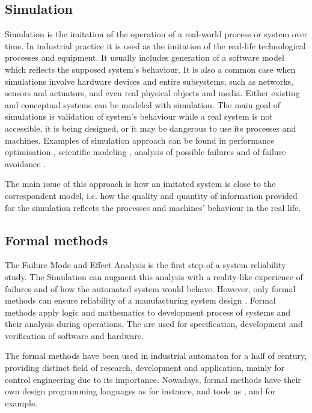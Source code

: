 \subsection{Simulation}

Simulation is the imitation of the operation of a real-world process or system
over time\cite{banks_introduction_1999}. In industrial practice it is used as
the imitation of the real-life technological processes and equipment. It usually
includes generation of a software model which reflects the supposed system's
behaviour. It is also a common case when simulations involve hardware devices
and entire subsystems, such as networks, sensors and actuators, and even real
physical objects and media. Either existing and conceptual systems can be
modeled with simulation. The main goal of simulations is validation of system's
behaviour while a real system is not accessible, it is being designed, or it may
be dangerous to use its processes and machines. Examples of simulation approach 
can be found in performance optimisation \cite{tamimi_simulation_2012},
scientific modeling \cite{sharda_best_2011}, analysis of possible failures
\cite{weatherford_simulation_2003} and of failure avoidance
\cite{warrington_modelling_2002}.

The main issue of this approach is how an imitated system is close to the
correspondent model, i.e. how the quality and quantity of information provided
for the simulation reflects the processes and machines' behaviour in the real
life.

\subsection{Formal methods}

The Failure Mode and Effect Analysis is the first step of a system reliability
study. The Simulation can augment this analysis with a reality-like experience
of failures and of how the automated system would behave. However, only formal
methods can ensure reliability of a manufacturing system design
\cite{holloway_why_1997}. Formal methods apply logic and mathematics to
development process of systems and their analysis during operations. The are
used for specification, development and verification of software and hardware.

The formal methods have been used in industrial automaton for a half of century,
providing distinct field of research, development and application, mainly
for control engineering due to its importance. Nowadays, formal methods have
their own design programming languages as  \cite{spivey_z_1992} for instance,
and tools as \cite{event_b_web}, \cite{atelier_b_web} and \cite{nusmv} for
example.

